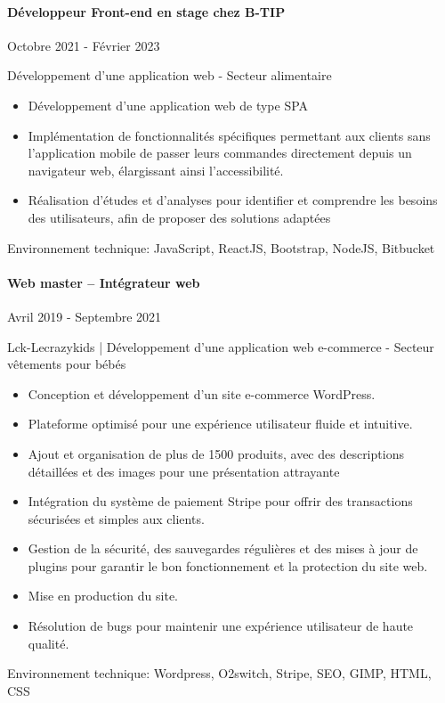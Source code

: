 \documentclass{article}
\begin{document}
\paragraph{Développeur Front-end en stage chez B-TIP}\hspace*{\fill}Octobre 2021 - Février 2023

\noindent
Développement d’une application web - Secteur alimentaire

\raggedright  
\begin{itemize}
  \item{Développement d'une application web de type SPA}
  \item{Implémentation de fonctionnalités spécifiques permettant aux clients sans l'application mobile de passer leurs commandes directement depuis un navigateur web, élargissant ainsi l'accessibilité.}
  \item{Réalisation d'études et d'analyses pour identifier et comprendre les besoins des utilisateurs, afin de proposer des solutions adaptées}
\end{itemize}
\noindent
Environnement technique: JavaScript, ReactJS, Bootstrap, NodeJS, Bitbucket
\paragraph{Web master – Intégrateur web}\hspace*{\fill}Avril 2019 - Septembre 2021

\noindent
Lck-Lecrazykids | Développement d’une application web e-commerce - Secteur vêtements pour bébés

\raggedright  
\begin{itemize}
  \item{Conception et développement d'un site e-commerce WordPress.}
  \item{Plateforme optimisé pour une expérience utilisateur fluide et intuitive.}
  \item{Ajout et organisation de plus de 1500 produits, avec des descriptions détaillées et des images pour une présentation attrayante}
  \item{Intégration du système de paiement Stripe pour offrir des transactions sécurisées et simples aux clients.}
  \item{Gestion de la sécurité, des sauvegardes régulières et des mises à jour de plugins pour garantir le bon fonctionnement et la protection du site web.}
  \item{Mise en production du site.}
  \item{Résolution de bugs pour maintenir une expérience utilisateur de haute qualité.}
\end{itemize}
\noindent
Environnement technique: Wordpress, O2switch, Stripe, SEO, GIMP, HTML, CSS
\end{document}
